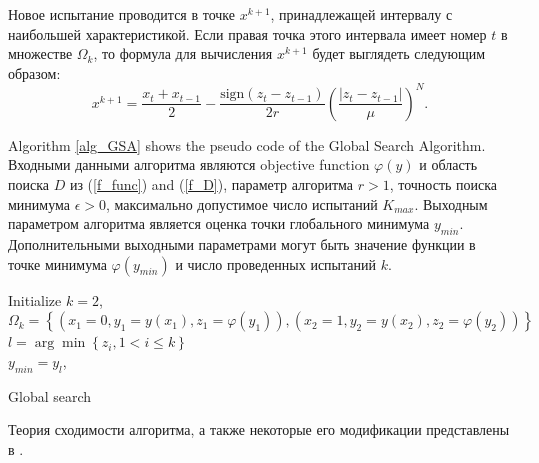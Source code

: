 \documentclass[preprint,12pt]{elsarticle}
\begin{document}
Новое испытание проводится в точке $x^{k+1}$, принадлежащей интервалу с наибольшей характеристикой. Если правая точка этого интервала имеет номер $t$ в множестве $\Omega_k$, то формула для вычисления $x^{k+1}$ будет выглядеть следующим образом:
\begin{equation}\label{xk1}
x^{k+1} = \frac{x_t+x_{t-1}}{2}- \frac{\mathrm{sign}(z_t-z_{t-1})}{2r} \left(\frac{\left|z_t-z_{t-1}\right|}{\mu}\right)^N.   
\end{equation}


Algorithm \ref{alg_GSA} shows the pseudo code of the Global Search Algorithm.
Входными данными алгоритма являются objective function $\varphi(y)$  и область поиска $D$ из (\ref{f_func}) and (\ref{f_D}), параметр алгоритма $r>1$, точность поиска минимума $\epsilon > 0$, максимально допустимое число испытаний $K_{max}$. Выходным параметром алгоритма является оценка точки глобального минимума $y_{min}$. Дополнительными выходными параметрами могут быть значение функции в точке минимума $\varphi(y_{min})$ и число проведенных испытаний $k$.

\begin{algorithm}
\LinesNumbered
 Initialize $k=2$, $\Omega_k= \left\{ (x_1=0, y_1=y(x_1), z_1=\varphi(y_1)), (x_2=1, y_2=y(x_2), z_2=\varphi(y_2)) \right\}$\\
 $l = \arg \min \left\{ z_i, 1 < i \leq k \right\}$\\
 $y_{min} = y_l$, \\ 
 \caption{Global search}\label{alg_GSA}
\end{algorithm}

Теория сходимости алгоритма, а также некоторые его модификации представлены в \cite{Strongin2000}.
\end{document}
